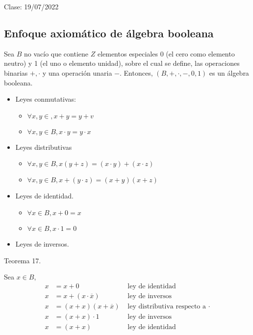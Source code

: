 Clase: 19/07/2022

\subsection{Enfoque axiomático de álgebra booleana}

\begin{definicion}
    Sea $B$ no vacío que contiene $Z$ elementos especiales 0 (el cero como elemento neutro) y 1 (el uno o elemento unidad), sobre el cual se define, las operaciones binarias $+,\cdot$ y una operación unaria $-$. Entonces, $(B,+,\cdot, -,0,1)$ es un álgebra booleana. 
    \begin{itemize}
        \item Leyes conmutativas: 
            \begin{itemize}
                \item $\forall x,y\in, x+y=y+v$
                \item $\forall x,y\in B, x\cdot y = y\cdot x$
            \end{itemize}
        \item Leyes distributivas 
            \begin{itemize}
                \item $\forall x,y\in B, x(y+z)=(x\cdot y)+ (x\cdot z)$
                \item $\forall x,y\in B, x+ (y\cdot z) = (x+y)(x+z)$
            \end{itemize}
        \item Leyes de identidad.
            \begin{itemize}
                \item $\forall x\in B, x+0=x$
                \item $\forall x\in B, x\cdot 1 = 0$
            \end{itemize}
        \item Leyes de inversos.
    \end{itemize}
\end{definicion}


\begin{teorema}
    Teorema 17.
    \begin{dem}
        Sea $x\in B$, 
        \begin{align*}
            x &= x+0 & \text{ ley de identidad}\\
            x &= x+(x\cdot \overline{x}) & \text{ ley de inversos}\\
            x &= (x+x)(x+\overline{x}) & \text{ ley distributiva respecto a $\cdot$}\\
            x &= (x+x)\cdot 1 & \text{ ley de inversos}\\
            x &= (x+x) & \text{ ley de identidad}\\
        \end{align*}
    \end{dem}
\end{teorema}


